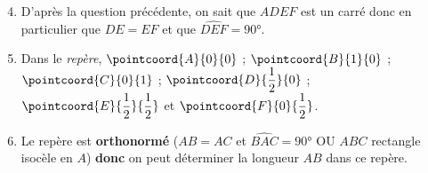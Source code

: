 \begin{minipage}{0.45\textwidth}
\thispagestyle{correction1}

\vspace*{1em}

\begin{enumerate}
	\setcounter{enumi}{3}
	\item D'après la question précédente, on sait que $ADEF$ est un carré donc en particulier que $DE = EF$ et que $\widehat{DEF} = 90°$.\\[1em]
	\item Dans le \emph{repère}, $\pointcoord{A}{0}{0}$ ; $\pointcoord{B}{1}{0}$ ; $\pointcoord{C}{0}{1}$ ; $\pointcoord{D}{\dfrac{1}{2}}{0}$ ; $\pointcoord{E}{\dfrac{1}{2}}{\dfrac{1}{2}}$ et $\pointcoord{F}{0}{\dfrac{1}{2}}$.
	\item Le repère est \textbf{orthonormé} ($AB = AC$ et $\widehat{BAC} = 90°$ OU $ABC$ rectangle isocèle en $A$) \textbf{donc} on peut déterminer la longueur $AB$ dans ce repère.
\end{enumerate}



\vspace*{1em}
\centering
{}

\end{minipage}
